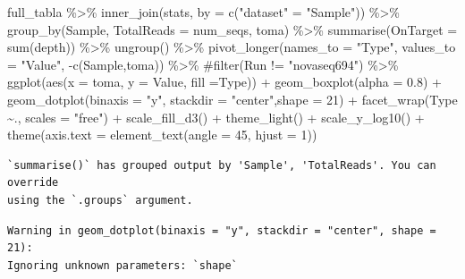 \documentclass[
  letterpaper,
  DIV=11,
  numbers=noendperiod]{scrartcl}
\newenvironment{Shaded}{\begin{snugshade}}{\end{snugshade}}
\newcommand{\AttributeTok}[1]{\textcolor[rgb]{0.40,0.45,0.13}{#1}}
\newcommand{\CommentTok}[1]{\textcolor[rgb]{0.37,0.37,0.37}{#1}}
\newcommand{\DecValTok}[1]{\textcolor[rgb]{0.68,0.00,0.00}{#1}}
\newcommand{\FloatTok}[1]{\textcolor[rgb]{0.68,0.00,0.00}{#1}}
\newcommand{\FunctionTok}[1]{\textcolor[rgb]{0.28,0.35,0.67}{#1}}
\newcommand{\NormalTok}[1]{\textcolor[rgb]{0.00,0.23,0.31}{#1}}
\newcommand{\OtherTok}[1]{\textcolor[rgb]{0.00,0.23,0.31}{#1}}
\newcommand{\SpecialCharTok}[1]{\textcolor[rgb]{0.37,0.37,0.37}{#1}}
\newcommand{\StringTok}[1]{\textcolor[rgb]{0.13,0.47,0.30}{#1}}
\begin{document}
\begin{Shaded}
\begin{Highlighting}[]
\NormalTok{full\_tabla }\SpecialCharTok{\%\textgreater{}\%} 
  \FunctionTok{inner\_join}\NormalTok{(stats, }\AttributeTok{by =} \FunctionTok{c}\NormalTok{(}\StringTok{"dataset"} \OtherTok{=} \StringTok{"Sample"}\NormalTok{)) }\SpecialCharTok{\%\textgreater{}\%} 
  \FunctionTok{group\_by}\NormalTok{(Sample, }\AttributeTok{TotalReads =}\NormalTok{ num\_seqs, toma) }\SpecialCharTok{\%\textgreater{}\%} 
  \FunctionTok{summarise}\NormalTok{(}\AttributeTok{OnTarget =} \FunctionTok{sum}\NormalTok{(depth)) }\SpecialCharTok{\%\textgreater{}\%} 
  \FunctionTok{ungroup}\NormalTok{() }\SpecialCharTok{\%\textgreater{}\%} 
  \FunctionTok{pivot\_longer}\NormalTok{(}\AttributeTok{names\_to =} \StringTok{"Type"}\NormalTok{, }\AttributeTok{values\_to =} \StringTok{"Value"}\NormalTok{, }\SpecialCharTok{{-}}\FunctionTok{c}\NormalTok{(Sample,toma)) }\SpecialCharTok{\%\textgreater{}\%} 
  \CommentTok{\#filter(Run != "novaseq694") \%\textgreater{}\% }
  \FunctionTok{ggplot}\NormalTok{(}\FunctionTok{aes}\NormalTok{(}\AttributeTok{x =}\NormalTok{ toma, }\AttributeTok{y =}\NormalTok{ Value, }\AttributeTok{fill =}\NormalTok{Type)) }\SpecialCharTok{+} 
  \FunctionTok{geom\_boxplot}\NormalTok{(}\AttributeTok{alpha =} \FloatTok{0.8}\NormalTok{) }\SpecialCharTok{+} 
  \FunctionTok{geom\_dotplot}\NormalTok{(}\AttributeTok{binaxis =} \StringTok{"y"}\NormalTok{, }\AttributeTok{stackdir =} \StringTok{"center"}\NormalTok{,}\AttributeTok{shape =} \DecValTok{21}\NormalTok{) }\SpecialCharTok{+}
  \FunctionTok{facet\_wrap}\NormalTok{(Type }\SpecialCharTok{\textasciitilde{}}\NormalTok{., }\AttributeTok{scales =} \StringTok{"free"}\NormalTok{) }\SpecialCharTok{+} 
  \FunctionTok{scale\_fill\_d3}\NormalTok{() }\SpecialCharTok{+}
  \FunctionTok{theme\_light}\NormalTok{() }\SpecialCharTok{+}
  \FunctionTok{scale\_y\_log10}\NormalTok{() }\SpecialCharTok{+}
  \FunctionTok{theme}\NormalTok{(}\AttributeTok{axis.text =} \FunctionTok{element\_text}\NormalTok{(}\AttributeTok{angle =} \DecValTok{45}\NormalTok{, }\AttributeTok{hjust =} \DecValTok{1}\NormalTok{))}
\end{Highlighting}
\end{Shaded}

\begin{verbatim}
`summarise()` has grouped output by 'Sample', 'TotalReads'. You can override
using the `.groups` argument.
\end{verbatim}

\begin{verbatim}
Warning in geom_dotplot(binaxis = "y", stackdir = "center", shape = 21):
Ignoring unknown parameters: `shape`
\end{verbatim}
\end{document}

